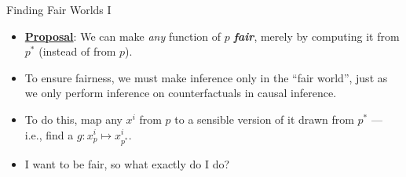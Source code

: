 \documentclass[12pt,t,handout]{beamer}
\begin{document}
\begin{frame}[c]{Finding Fair Worlds I}

\begin{center}
\begin{itemize}
  \itemsep10pt
  \item \underline{\textbf{Proposal}}: We can make \textit{any} function of $p$
    \textbf{\textit{fair}}, merely by computing it from $p^*$ (instead of from
    $p$).
  \item To ensure fairness, we must make inference only in the ``fair world'',
    just as we only perform inference on counterfactuals in causal inference.
  \item To do this, map any $x^i$ from $p$ to a sensible version of it drawn
    from $p^*$ --- i.e., find a $g: x^i_{p} \mapsto x^i_{p^*}$.
  \item I want to be fair, so what exactly do I do?
\end{itemize}
\end{center}


\end{frame}

\end{document}
